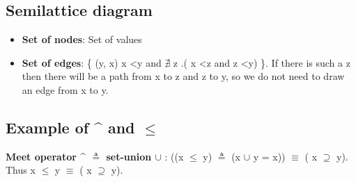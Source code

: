 \subsection{Semilattice diagram}
\begin{itemize}
\item \textbf{Set of nodes}: Set of values
\item \textbf{Set of edges}: \{ (y, x) {\textbar} x \textless  y and $\nexists$ z .( x \textless  z and z \textless  y)  \}. If there is such a z then there will be a path from x to z and z to y, so we do not need to draw an edge from x to y.
\end{itemize}

\subsection{Example of \^{} and $\leq$}
\textbf{Meet operator \^{} $\triangleq$ set-union $\cup$} : ((x $\leq$ y) $\triangleq$ (x $\cup$ y = x)) $\equiv$ ( x $\supseteq$ y). Thus x $\leq$ y $\equiv$ ( x $\supseteq$ y).